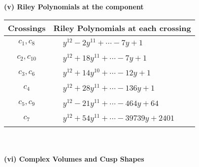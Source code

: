 \documentclass[1p]{elsarticle_modified}
\theoremstyle{definition}
\begin{document}
\newpage\renewcommand{\arraystretch}{1}
\flushleft \textbf{(v) Riley Polynomials at the component}\newline \\
\begin{tabular}{m{50pt}|m{274pt}}
Crossings & \hspace{64pt}Riley Polynomials at each crossing \\
\hline $$\begin{aligned}c_{1},c_{8}\end{aligned}$$&$\begin{aligned}
&y^{12}-2 y^{11}+\cdots-7 y+1
\end{aligned}$\\
\hline $$\begin{aligned}c_{2},c_{10}\end{aligned}$$&$\begin{aligned}
&y^{12}+18 y^{11}+\cdots-7 y+1
\end{aligned}$\\
\hline $$\begin{aligned}c_{3},c_{6}\end{aligned}$$&$\begin{aligned}
&y^{12}+14 y^{10}+\cdots-12 y+1
\end{aligned}$\\
\hline $$\begin{aligned}c_{4}\end{aligned}$$&$\begin{aligned}
&y^{12}+28 y^{11}+\cdots-136 y+1
\end{aligned}$\\
\hline $$\begin{aligned}c_{5},c_{9}\end{aligned}$$&$\begin{aligned}
&y^{12}-21 y^{11}+\cdots-464 y+64
\end{aligned}$\\
\hline $$\begin{aligned}c_{7}\end{aligned}$$&$\begin{aligned}
&y^{12}+54 y^{11}+\cdots-39739 y+2401
\end{aligned}$\\
\hline
\end{tabular}\\~\\
\newpage\flushleft \textbf{(vi) Complex Volumes and Cusp Shapes}
\end{document}
